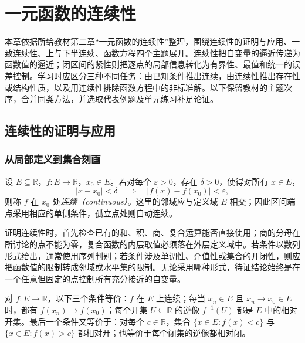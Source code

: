 \setcounter{chapter}{1} %
\chapter{一元函数的连续性}
\label{chap:pei-continuity}

本章依据所给教材第二章“一元函数的连续性”整理，围绕连续性的证明与应用、一致连续性、上与下半连续、函数方程四个主题展开。连续性把自变量的逼近传递为函数值的逼近；闭区间的紧性则把逐点的局部信息转化为有界性、最值和统一的误差控制。学习时应区分三种不同任务：由已知条件推出连续，由连续性推出存在性或结构性质，以及用连续性排除函数方程中的非标准解。以下保留教材的主题次序，合并同类方法，并选取代表例题及单元练习补足论证。

\section{连续性的证明与应用}
\label{sec:pei-continuity-proofs}

\subsection{从局部定义到集合刻画}

\begin{definition}
设 $E\subseteq\mathbb R$，$f:E\to\mathbb R$，$x_0\in E$。若对每个 $\varepsilon>0$，存在 $\delta>0$，使得对所有 $x\in E$，
\[
|x-x_0|<\delta\quad\Longrightarrow\quad |f(x)-f(x_0)|<\varepsilon,
\]
则称 $f$ 在 $x_0$ 处\emph{连续（continuous）}。这里的邻域应与定义域 $E$ 相交；因此区间端点采用相应的单侧条件，孤立点处则自动连续。
\end{definition}

证明连续性时，首先检查已有的和、积、商、复合运算能否直接使用；商的分母在所讨论的点不能为零，复合函数的内层取值必须落在外层定义域中。若条件以数列形式给出，通常使用序列判别；若条件涉及单调性、介值性或集合的开闭性，则应把函数值的限制转成邻域或水平集的限制。无论采用哪种形式，待证结论始终是在一个任意但固定的点控制所有充分接近的自变量。

\begin{proposition}
\label{prop:pei-continuity-characterizations}
对 $f:E\to\mathbb R$，以下三个条件等价：$f$ 在 $E$ 上连续；每当 $x_n\in E$ 且 $x_n\to x_0\in E$ 时，都有 $f(x_n)\to f(x_0)$；每个开集 $U\subseteq\mathbb R$ 的逆像 $f^{-1}(U)$ 都是 $E$ 中的相对开集。最后一个条件又等价于：对每个 $c\in\mathbb R$，集合 $\{x\in E:f(x)<c\}$ 与 $\{x\in E:f(x)>c\}$ 都相对开；也等价于每个闭集的逆像都相对闭。
\end{proposition}

